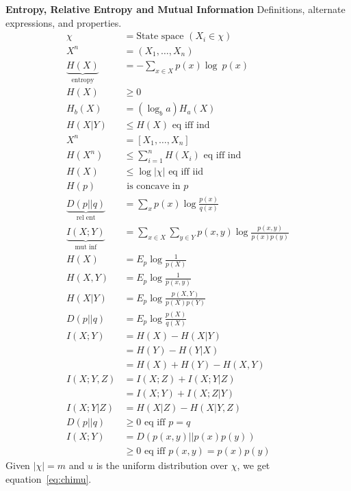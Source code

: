 \documentclass[10pt]{article}
\begin{document}
\begin{tiny}
\begin{multicols}{3}



\fontsize{5.99999pt}{5pt}

\textbf{\scriptsize Entropy, Relative Entropy and Mutual Information}
Definitions, alternate expressions, and properties.
\begin{align}
\chi &= \text{State space } (X_i \in \chi)\\
X^n &=(X_1,\ldots,X_n) \\
\underbrace{H(X)}_\text{entropy}&= -\sum_{x\in X} p(x) \log\ p(x) \label{eq:entropy}\\
H(X)& \geq 0\\
H_b(X)&= (\log_b a)H_a(X)\\
H(X|Y)& \leq  H(X)\text{ eq iff ind} \label{eq:conditioning}\\
X^n&=[X_1,\ldots,X_n]\\
H(X^n)& \leq \sum_{i=1}^n H(X_i)\text{ eq iff ind} \label{eq:jointsum}\\
H(X)&\leq  \log |\chi|  \text{ eq iff iid}\label{eq:alphabetentropy}\\
H(p)&\text{ is concave in $p$}\\
\underbrace{D(p||q)}_\text{rel ent} & = \sum_x p(x) \log \frac{p(x)}{q(x)}\\
\underbrace{I(X;Y)}_\text{mut inf} & = \sum_{x\in X} \sum_{y \in Y} p(x,y) \log \frac{p(x,y)}{p(x)p(y)}\\
H(X)&=E_p \log \frac{1}{p(X)}\\
H(X,Y)&=E_p\log \frac{1}{p(x,y)}\\
H(X|Y)&=E_p\log \frac{p(X,Y)}{p(X)p(Y)}\\
D(p||q)&=E_p\log \frac{p(X)}{q(X)}\\
I(X;Y)&=H(X)-H(X|Y)\\
&=H(Y)-H(Y|X)\\
&=H(X)+H(Y)-H(X,Y)\\
I(X;Y,Z) &= I(X;Z) + I(X;Y|Z) \\
&= I(X;Y) + I(X;Z|Y)\\
I(X;Y|Z) &= H(X|Z) - H(X|Y,Z) \\
D(p||q)&\geq 0 \text{ eq iff $p=q$}\\
I(X;Y)&=D(p(x,y)||p(x)p(y))\\
	&\geq 0 \text{ eq iff $p(x,y)=p(x)p(y)$}
\end{align}
Given $|\chi|=m$ and $u$ is the uniform distribution over $\chi$, we get equation~\ref{eq:chimu}.

\end{multicols}
\end{tiny}
\end{document}

